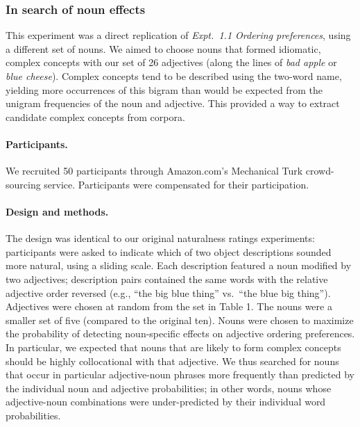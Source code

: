 \documentclass[12pt]{article}
\newcommand{\jd}[1]{\textcolor{red}{[jd: #1]}}
\begin{document}
\subsubsection{In search of noun effects}

This experiment was a direct replication of \emph{Expt.~1.1 Ordering preferences}, using a different set of nouns. We aimed to choose nouns that formed idiomatic, complex concepts with our set of 26 adjectives (along the lines of \emph{bad apple} or \emph{blue cheese}).  %
Complex concepts tend to be described using the two-word name, yielding more occurrences of this bigram than would be expected from the unigram frequencies of the noun and adjective. This provided a way to extract candidate complex concepts from corpora.


\paragraph{Participants.}

We recruited 50 participants through Amazon.com's Mechanical Turk crowd-sourcing service. Participants were compensated for their participation.

\paragraph{Design and methods.}

The design was identical to our original naturalness ratings experiments: participants were asked to indicate which of two object descriptions sounded more natural, using a sliding scale. Each description featured a noun modified by two adjectives; description pairs contained the same words with the relative adjective order reversed (e.g., ``the big blue thing'' vs.~``the blue big thing''). Adjectives were chosen at random from the set in Table 1. The nouns were a smaller set of five (compared to the original ten). Nouns were chosen to maximize the probability of detecting noun-specific effects on adjective ordering preferences. In particular, we expected that nouns that are likely to form complex concepts should be 
highly collocational with that adjective. We thus searched for nouns that occur in particular adjective-noun phrases more frequently than predicted by the individual noun and adjective probabilities; in other words, nouns whose adjective-noun combinations were under-predicted by their individual word probabilities. 
\end{document}
